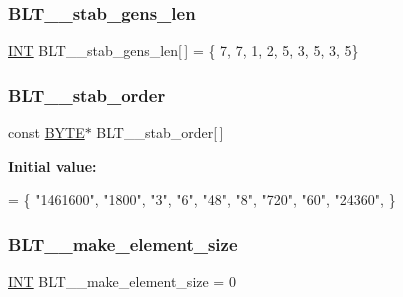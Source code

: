 \subsubsection{\texorpdfstring{B\+L\+T\+\_\+\_\+stab\+\_\+gens\+\_\+len}{BLT\_29\_stab\_gens\_len}}
{\footnotesize\ttfamily \mbox{\hyperlink{galois_8h_a09fddde158a3a20bd2dcadb609de11dc}{I\+NT}} B\+L\+T\+\_\+\_\+stab\+\_\+gens\+\_\+len\mbox{[}$\,$\mbox{]} = \{ 7, 7, 1, 2, 5, 3, 5, 3, 5\}}

\mbox{\label{data___b_l_t_8_c_af9ea3f34a76335fb1a854669923d3fab}} 
\subsubsection{\texorpdfstring{B\+L\+T\+\_\+\_\+stab\+\_\+order}{BLT\_29\_stab\_order}}
{\footnotesize\ttfamily const \mbox{\hyperlink{galois_8h_ab6cc7b4aeb6ea31aba2b3fbfc83ff5e6}{B\+Y\+TE}}$\ast$ B\+L\+T\+\_\+\_\+stab\+\_\+order\mbox{[}$\,$\mbox{]}}

{\bfseries Initial value\+:}
\begin{DoxyCode}
= \{
\textcolor{stringliteral}{"1461600"},
\textcolor{stringliteral}{"1800"},
\textcolor{stringliteral}{"3"},
\textcolor{stringliteral}{"6"},
\textcolor{stringliteral}{"48"},
\textcolor{stringliteral}{"8"},
\textcolor{stringliteral}{"720"},
\textcolor{stringliteral}{"60"},
\textcolor{stringliteral}{"24360"},
\}
\end{DoxyCode}
\mbox{\label{data___b_l_t_8_c_ad35c96522791126ef784cc1a2518a208}} 
\subsubsection{\texorpdfstring{B\+L\+T\+\_\+\_\+make\+\_\+element\+\_\+size}{BLT\_31\_make\_element\_size}}
{\footnotesize\ttfamily \mbox{\hyperlink{galois_8h_a09fddde158a3a20bd2dcadb609de11dc}{I\+NT}} B\+L\+T\+\_\+\_\+make\+\_\+element\+\_\+size = 0}

